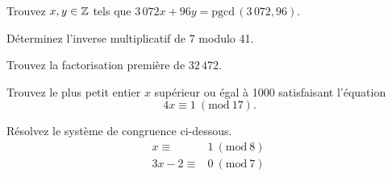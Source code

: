 \documentclass{Preparation}
\begin{document}
  \begin{question}
  Trouvez $x,y\in\operatorname{\mathbb{Z}}$ tels que $3\,072x+96y=\textrm{pgcd}\,(3\,072, 96)$.
  \end{question}
    
  \begin{question}
   Déterminez l'inverse multiplicatif de 7 modulo 41.
   \end{question}
    
  \begin{question}
  Trouvez la factorisation première de $32\,472$.
  \end{question}
  \begin{question}Trouvez le plus petit entier $x$ supérieur ou égal à 1000 satisfaisant l'équation $$4x\equiv 1~(\text{mod}~17).$$
  \end{question}
  \begin{question}
  Résolvez le système de congruence ci-dessous.
  \begin{eqnarray*}
      x\equiv & 1~(\text{mod}~8)\\
      3x-2\equiv & 0~(\text{mod}~7)\
  \end{eqnarray*}
   \end{question}
\end{document}
